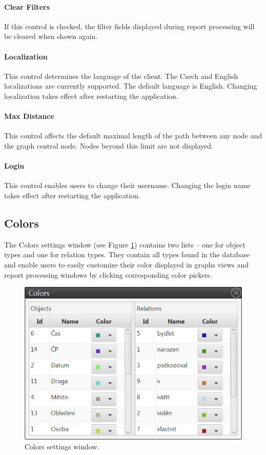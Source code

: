 \paragraph{Clear Filters} If this control is checked, the filter fields
displayed during report processing will be cleared when shown again.

\paragraph{Localization} This control determines the language of the \textan{}
client. The Czech and English localizations are currently supported. The
default language is English. Changing localization takes effect after
restarting the application.

\paragraph{Max Distance} This control affects the default maximal length of the
path between any node and the graph central node. Nodes beyond this limit are
not displayed.

\paragraph{Login} This control enables users to change their username. Changing
the login name takes effect after restarting the application.

\subsection{Colors}

The Colors settings window (see Figure \ref{fig:Colors}) contains two lists --
one for object types and one for relation types. They contain all types found
in the database and enable users to easily customize their color displayed in
graphs views and report processing windows by clicking corresponding color
pickers.

\begin{figure}[!htb]
        \centering
        \includegraphics[width=\textwidth]{Images/colors}
        \caption{Colors settings window.}
        \label{fig:Colors}
\end{figure}

